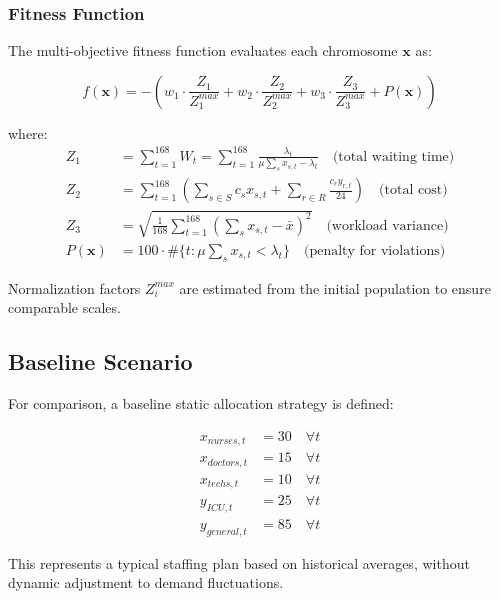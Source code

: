 \documentclass[12pt,a4paper]{article}
\begin{document}
	\subsubsection{Fitness Function}
	
	The multi-objective fitness function evaluates each chromosome $\mathbf{x}$ as:
	
	\begin{equation}
		f(\mathbf{x}) = -\left( w_1 \cdot \frac{Z_1}{Z_1^{max}} + w_2 \cdot \frac{Z_2}{Z_2^{max}} + w_3 \cdot \frac{Z_3}{Z_3^{max}} + P(\mathbf{x}) \right)
	\end{equation}
	
	where:
	\begin{align*}
		Z_1 &= \sum_{t=1}^{168} W_t = \sum_{t=1}^{168} \frac{\lambda_t}{\mu \sum_s x_{s,t} - \lambda_t} \quad \text{(total waiting time)} \\
		Z_2 &= \sum_{t=1}^{168} \left( \sum_{s \in S} c_s x_{s,t} + \sum_{r \in R} \frac{c_r y_{r,t}}{24} \right) \quad \text{(total cost)} \\
		Z_3 &= \sqrt{\frac{1}{168} \sum_{t=1}^{168} \left( \sum_s x_{s,t} - \bar{x} \right)^2} \quad \text{(workload variance)} \\
		P(\mathbf{x}) &= 100 \cdot \#\{t : \mu \sum_s x_{s,t} < \lambda_t\} \quad \text{(penalty for violations)}
	\end{align*}
	
	Normalization factors $Z_i^{max}$ are estimated from the initial population to ensure comparable scales.
	
	\subsection{Baseline Scenario}
	
	For comparison, a baseline static allocation strategy is defined:
	
	\begin{align*}
		x_{nurses,t} &= 30 \quad \forall t \\
		x_{doctors,t} &= 15 \quad \forall t \\
		x_{techs,t} &= 10 \quad \forall t \\
		y_{ICU,t} &= 25 \quad \forall t \\
		y_{general,t} &= 85 \quad \forall t
	\end{align*}
	
	This represents a typical staffing plan based on historical averages, without dynamic adjustment to demand fluctuations.
	
\end{document}
